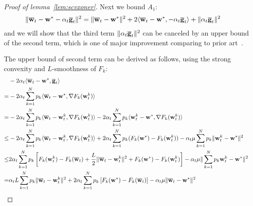 \begin{proof}[Proof of lemma~\ref{lem:scvxoner}]
	Next we bound $A_{1}$: 
	\begin{align*}
	\|{\overline{\mathbf{w}}}_{t}-{\mathbf{w}}^{\ast}-\alpha_{t}{\overline{\mathbf{g}}}_{t}\|^{2} & =\|{\overline{\mathbf{w}}}_{t}-{\mathbf{w}}^{\ast}\|^{2}+2\langle{\overline{\mathbf{w}}}_{t}-{\mathbf{w}}^{\ast},-\alpha_{t}{\overline{\mathbf{g}}}_{t}\rangle+\|\alpha_{t}{\overline{\mathbf{g}}}_{t}\|^{2}
	\end{align*}
	and we will show that the third term $\|\alpha_{t}{\overline{\mathbf{g}}}_{t}\|^{2}$
	can be canceled by an upper bound of the second term, which is one of major improvement comparing to prior art~\cite{li2019convergence}.
	\begin{comment}
	The last term is straightforward to bound by the convexity of $\|\cdot\|^{2}$
	and $L$-smoothness of $F_{k}$,
	\begin{align*}
	\alpha_{t}^{2}\|\ov{g}_{t}\|^{2} & \leq\alpha_{t}^{2}\sum_{k=1}^{N}p_{k}\|\nabla F_{k}(\vw_{t}^{k})\|^{2}\leq2L\alpha_{t}^{2}\sum_{k=1}^{N}p_{k}(F_{k}(\vw_{t}^{k})-F_{k}^{\ast})
	\end{align*}
	or 
	\begin{align*}
	\alpha_{t}^{2}\|\ov{g}_{t}\|^{2} & \leq\alpha_{t}^{2}\sum_{k=1}^{N}p_{k}\|\nabla F_{k}(\vw_{t}^{k})\|^{2}\leq\alpha_{t}^{2}\sum_{k=1}^{N}p_{k}\mathbb{E}\|\nabla F_{k}(\vw_{t}^{k},\mathbf{\xi}_{t}^{k})\|^{2}\leq\alpha_{t}^{2}G^{2}
	\end{align*}
	\end{comment}
	The upper bound of second term can be derived as follows, 	using the strong convexity and $L$-smoothness of $F_{k}$:
	\begin{align*}
	& -2\alpha_{t}\langle\ov{w}_{t}-\vw^{\ast},\ov{g}_{t}\rangle\\
	=& -2\alpha_{t}\sum_{k=1}^{N}p_{k}\langle\ov{w}_{t}-\vw^{\ast},\nabla F_{k}(\vw_{t}^{k})\rangle\\
	=& -2\alpha_{t}\sum_{k=1}^{N}p_{k}\langle\ov{w}_{t}-\vw_{t}^{k},\nabla F_{k}(\vw_{t}^{k})\rangle-2\alpha_{t}\sum_{k=1}^{N}p_{k}\langle \vw_{t}^{k}-\vw^{\ast},\nabla F_{k}(\vw_{t}^{k})\rangle\\
	\leq&-2\alpha_{t}\sum_{k=1}^{N}p_{k}\langle\ov{w}_{t}-\vw_{t}^{k},\nabla F_{k}(\vw_{t}^{k})\rangle+2\alpha_{t}\sum_{k=1}^{N}p_{k}(F_{k}(\vw^{\ast})-F_{k}(\vw_{t}^{k}))-\alpha_{t}\mu\sum_{k=1}^{N}p_{k}\|\vw_{t}^{k}-\vw^{\ast}\|^{2}\\
	\leq& 2\alpha_{t}\sum_{k=1}^{N}p_{k}\left[F_{k}(\vw_{t}^{k})-F_{k}(\ov{w}_{t})+\frac{L}{2}\|\ov{w}_{t}-\vw_{t}^{k}\|^{2}+F_{k}(\vw^{\ast})-F_{k}(\vw_{t}^{k})\right]-\alpha_{t}\mu\|\sum_{k=1}^{N}p_{k}\vw_{t}^{k}-\vw^{\ast}\|^{2}\\
	=& \alpha_{t}L\sum_{k=1}^{N}p_{k}\|\ov{w}_{t}-\vw_{t}^{k}\|^{2}+2\alpha_{t}\sum_{k=1}^{N}p_{k}\left[F_{k}(\vw^{\ast})-F_{k}(\ov{w}_{t})\right]-\alpha_{t}\mu\|\ov{w}_{t}-\vw^{\ast}\|^{2}

\end{align*}
\end{proof}
